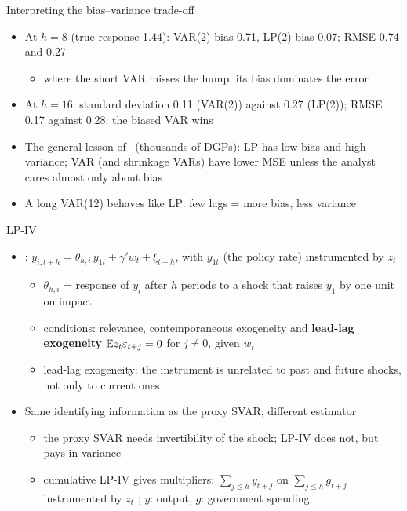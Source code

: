 \begin{frame}{Interpreting the bias--variance trade-off}
\itemsize{\small}
\begin{itemize}
    \item At $h = 8$ (true response 1.44): VAR(2) bias 0.71, LP(2) bias 0.07; RMSE 0.74 and 0.27
    \begin{itemize}
        \item where the short VAR misses the hump, its bias dominates the error
    \end{itemize}
    \item At $h = 16$: standard deviation 0.11 (VAR(2)) against 0.27 (LP(2)); RMSE 0.17 against 0.28: the biased VAR wins
    \item The general lesson of \ (thousands of DGPs): LP has low bias and high variance; VAR (and shrinkage VARs) have lower MSE unless the analyst cares almost only about bias
    \item A long VAR(12) behaves like LP: few lags = more bias, less variance
\end{itemize}
\end{frame}

\begin{frame}{LP-IV}
\itemsize{\small}
\begin{itemize}
    \item {}: $y_{i,t+h} = \theta_{h,i}\,y_{1t} + \gamma'w_t + \xi_{t+h}$, with $y_{1t}$ (the policy rate) instrumented by $z_t$
    \begin{itemize}
        \item $\theta_{h,i}$ = response of $y_i$ after $h$ periods to a shock that raises $y_1$ by one unit on impact
        \item conditions: relevance, contemporaneous exogeneity and \textbf{lead-lag exogeneity} $\mathbb{E} z_t\varepsilon_{t+j} = 0$ for $j \ne 0$, given $w_t$
        \item lead-lag exogeneity: the instrument is unrelated to past and future shocks, not only to current ones
    \end{itemize}
    \item Same identifying information as the proxy SVAR; different estimator
    \begin{itemize}
        \item the proxy SVAR needs invertibility of the shock; LP-IV does not, but pays in variance
        \item cumulative LP-IV gives multipliers: $\sum_{j\le h}y_{t+j}$ on $\sum_{j\le h}g_{t+j}$ instrumented by $z_t$ ; $y$: output, $g$: government spending
    \end{itemize}
\end{itemize}
\end{frame}

